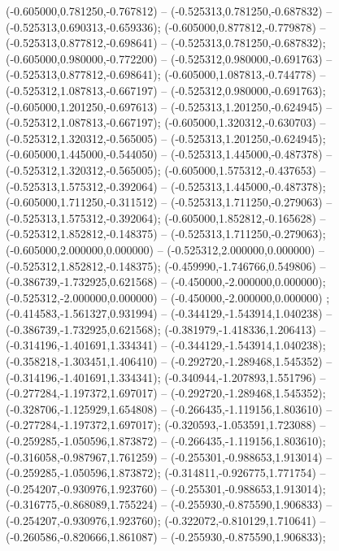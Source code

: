  (-0.605000,0.781250,-0.767812) -- (-0.525313,0.781250,-0.687832) -- (-0.525313,0.690313,-0.659336);
 (-0.605000,0.877812,-0.779878) -- (-0.525313,0.877812,-0.698641) -- (-0.525313,0.781250,-0.687832);
 (-0.605000,0.980000,-0.772200) -- (-0.525312,0.980000,-0.691763) -- (-0.525313,0.877812,-0.698641);
 (-0.605000,1.087813,-0.744778) -- (-0.525312,1.087813,-0.667197) -- (-0.525312,0.980000,-0.691763);
 (-0.605000,1.201250,-0.697613) -- (-0.525313,1.201250,-0.624945) -- (-0.525312,1.087813,-0.667197);
 (-0.605000,1.320312,-0.630703) -- (-0.525312,1.320312,-0.565005) -- (-0.525313,1.201250,-0.624945);
 (-0.605000,1.445000,-0.544050) -- (-0.525313,1.445000,-0.487378) -- (-0.525312,1.320312,-0.565005);
 (-0.605000,1.575312,-0.437653) -- (-0.525313,1.575312,-0.392064) -- (-0.525313,1.445000,-0.487378);
 (-0.605000,1.711250,-0.311512) -- (-0.525313,1.711250,-0.279063) -- (-0.525313,1.575312,-0.392064);
 (-0.605000,1.852812,-0.165628) -- (-0.525312,1.852812,-0.148375) -- (-0.525313,1.711250,-0.279063);
 (-0.605000,2.000000,0.000000) -- (-0.525312,2.000000,0.000000) -- (-0.525312,1.852812,-0.148375);
 (-0.459990,-1.746766,0.549806) -- (-0.386739,-1.732925,0.621568) -- (-0.450000,-2.000000,0.000000);
 (-0.525312,-2.000000,0.000000) -- (-0.450000,-2.000000,0.000000) ;
 (-0.414583,-1.561327,0.931994) -- (-0.344129,-1.543914,1.040238) -- (-0.386739,-1.732925,0.621568);
 (-0.381979,-1.418336,1.206413) -- (-0.314196,-1.401691,1.334341) -- (-0.344129,-1.543914,1.040238);
 (-0.358218,-1.303451,1.406410) -- (-0.292720,-1.289468,1.545352) -- (-0.314196,-1.401691,1.334341);
 (-0.340944,-1.207893,1.551796) -- (-0.277284,-1.197372,1.697017) -- (-0.292720,-1.289468,1.545352);
 (-0.328706,-1.125929,1.654808) -- (-0.266435,-1.119156,1.803610) -- (-0.277284,-1.197372,1.697017);
 (-0.320593,-1.053591,1.723088) -- (-0.259285,-1.050596,1.873872) -- (-0.266435,-1.119156,1.803610);
 (-0.316058,-0.987967,1.761259) -- (-0.255301,-0.988653,1.913014) -- (-0.259285,-1.050596,1.873872);
 (-0.314811,-0.926775,1.771754) -- (-0.254207,-0.930976,1.923760) -- (-0.255301,-0.988653,1.913014);
 (-0.316775,-0.868089,1.755224) -- (-0.255930,-0.875590,1.906833) -- (-0.254207,-0.930976,1.923760);
 (-0.322072,-0.810129,1.710641) -- (-0.260586,-0.820666,1.861087) -- (-0.255930,-0.875590,1.906833);

